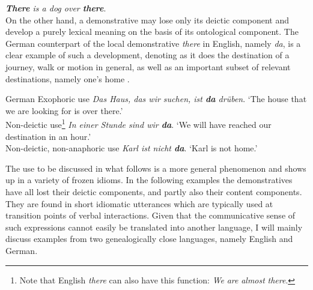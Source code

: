 \documentclass[output=paper,colorlinks,citecolor=brown]{langscibook}
\begin{document}
\ea\label{ex:koenig:9}
\textit{\textbf{There} is a dog over \textbf{there}}.\\
\z
On the other hand, a demonstrative may lose only its deictic component and develop a purely lexical meaning on the basis of its ontological component. The German counterpart of the local demonstrative \textit{there} in English, namely \textit{da}, is a clear example of such a development, denoting as it does the destination of a journey, walk or motion in general, as well as an important subset of relevant destinations, namely one’s home .

\ea German\label{ex:koenig:10}
\ea Exophoric use
\glt \textit{Das Haus, das wir suchen, ist \textbf{da} drüben}. \newline ‘The house that we are looking for is over there.’\\

\ex Non-deictic use\footnote{Note that English \textit{there} can also have this function: \textit{We} \textit{are} \textit{almost} \textit{there}.}
\glt \textit{In einer Stunde sind wir \textbf{da}}. \newline ‘We will have reached our destination in an hour.’\\

\ex Non-deictic, non-anaphoric use
\glt \textit{Karl ist nicht \textbf{da}}. \newline ‘Karl is not home.’\\
\z
\z

The use to be discussed in what follows is a more general phenomenon and shows up in a variety of frozen idioms. In the following examples the demonstratives have all lost their deictic components, and partly also their content components. They are found in short idiomatic utterances which are typically used at transition points of verbal interactions. Given that the communicative sense of such expressions cannot easily be translated into another language, I will mainly discuss examples from two genealogically close languages, namely English and German.
\end{document}
